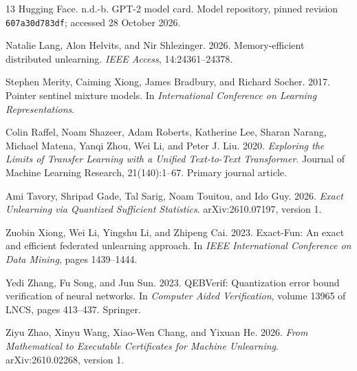 \documentclass[11pt,a4paper]{article}
\def\href#1#2{{#2}}
\begin{document}
\begin{thebibliography}{13}
Hugging Face. n.d.-b.
\href{https://huggingface.co/openai-community/gpt2/blob/607a30d783dfa663caf39e06633721c8d4cfcd7e/README.md}{GPT-2 model card}.
Model repository, pinned revision \nolinkurl{607a30d783df}; accessed 28 October 2026.

Natalie Lang, Alon Helvits, and Nir Shlezinger. 2026.
\href{https://doi.org/10.1109/ACCESS.2026.3663428}{Memory-efficient distributed unlearning}.
\emph{IEEE Access}, 14:24361--24378.

Stephen Merity, Caiming Xiong, James Bradbury, and Richard Socher. 2017.
\href{https://openreview.net/pdf?id=Byj72udxe}{Pointer sentinel mixture models}.
In \emph{International Conference on Learning Representations}.

Colin Raffel, Noam Shazeer, Adam Roberts, Katherine Lee, Sharan Narang,
Michael Matena, Yanqi Zhou, Wei Li, and Peter J. Liu.
2020. \emph{Exploring the Limits of Transfer Learning with a Unified Text-to-Text
Transformer}. Journal of Machine Learning Research, 21(140):1--67.
\href{https://jmlr.org/papers/v21/20-074.html}{Primary journal article}.

Ami Tavory, Shripad Gade, Tal Sarig, Noam Touitou, and Ido Guy.
2026. \emph{Exact Unlearning via Quantized Sufficient Statistics}.
\href{https://arxiv.org/html/2610.07197v1}{arXiv:2610.07197, version 1}.

Zuobin Xiong, Wei Li, Yingshu Li, and Zhipeng Cai. 2023.
\href{https://doi.org/10.1109/ICDM58522.2023.00188}{Exact-Fun: An exact and efficient federated unlearning approach}.
In \emph{IEEE International Conference on Data Mining}, pages 1439--1444.

Yedi Zhang, Fu Song, and Jun Sun. 2023.
\href{https://doi.org/10.1007/978-3-031-37703-7_20}{QEBVerif: Quantization error bound verification of neural networks}.
In \emph{Computer Aided Verification}, volume 13965 of LNCS, pages 413--437. Springer.

Ziyu Zhao, Xinyu Wang, Xiao-Wen Chang, and Yixuan He.
2026. \emph{From Mathematical to Executable Certificates for Machine Unlearning}.
\href{https://arxiv.org/html/2610.02268v1}{arXiv:2610.02268, version 1}.
\end{thebibliography}
\end{document}
